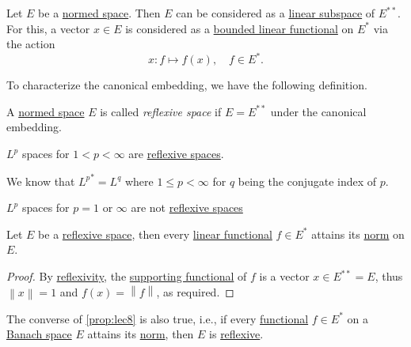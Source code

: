 \begin{theorem}\label{thm:second-dual-space}
	Let \(E\) be a \hyperref[def:normed-vector-space]{normed space}. Then \(E\) can be considered as a \hyperref[def:linear-vector-space]{linear subspace} of \(E^{\ast\ast}\). For this, a vector \(x\in E\) is considered as a \hyperref[def:bounded-linear-functional]{bounded linear functional} on \(E^{\ast} \) via the action
	\[
		x\colon f\mapsto f(x),\quad f\in E^{\ast}.
	\]
\end{theorem}

To characterize the canonical embedding, we have the following definition.

\begin{definition}\label{def:reflexive-space}
	A \hyperref[def:normed-vector-space]{normed space} \(E\) is called \emph{reflexive space} if \(E = E^{\ast\ast} \) under the canonical embedding.
\end{definition}

\begin{eg}
	\(L^p\) spaces for \(1 < p < \infty \) are \hyperref[def:reflexive-space]{reflexive spaces}.
\end{eg}
\begin{explanation}
	We know that \({L^p}^{\ast} = L^q\) where \(1 \leq p < \infty \) for \(q\) being the conjugate index of \(p\).
\end{explanation}
\begin{eg}
	\(L^p\) spaces for \(p = 1\) or \(\infty \) are not \hyperref[def:reflexive-space]{reflexive spaces}
\end{eg}

\begin{proposition}\label{prop:lec8}
	Let \(E\) be a \hyperref[def:reflexive-space]{reflexive space}, then every \hyperref[def:linear-functional]{linear functional} \(f\in E^{\ast} \) attains its \hyperref[def:norm]{norm} on \(E\).
\end{proposition}
\begin{proof}
	By \hyperref[def:reflexive-space]{reflexivity}, the \hyperref[thm:supporting-functional]{supporting functional} of \(f\) is a vector \(x\in E^{\ast\ast} = E\), thus \(\left\lVert x\right\rVert = 1\) and \(f(x) = \left\lVert f\right\rVert\), as required.
\end{proof}

\begin{remark}
	The converse of \autoref{prop:lec8} is also true, i.e., if every \hyperref[def:linear-functional]{functional} \(f\in E^{\ast} \) on a \hyperref[def:Banach-space]{Banach space} \(E\) attains its \hyperref[def:norm]{norm}, then \(E\) is \hyperref[def:reflexive-space]{reflexive}.
\end{remark}